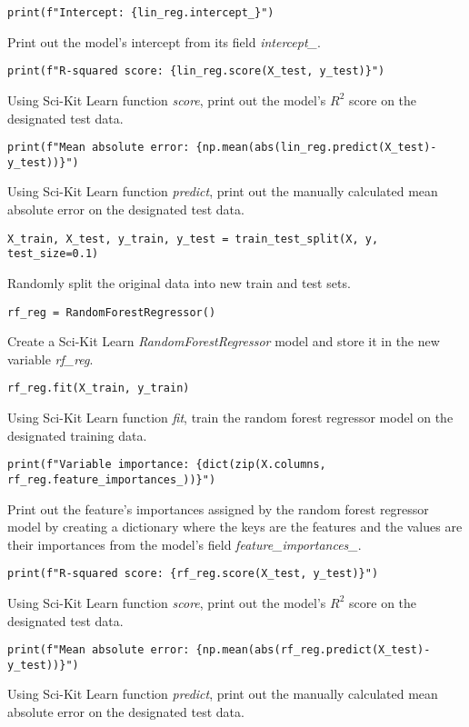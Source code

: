 \documentclass{article}
\begin{document}
\begin{lstlisting}
print(f"Intercept: {lin_reg.intercept_}")
\end{lstlisting}
Print out the model's intercept from its field \textit{intercept_}.
\begin{lstlisting}
print(f"R-squared score: {lin_reg.score(X_test, y_test)}")
\end{lstlisting}
Using Sci-Kit Learn function \textit{score}, print out the model's $R^2$ score on the designated test data.
\begin{lstlisting}
print(f"Mean absolute error: {np.mean(abs(lin_reg.predict(X_test)- y_test))}")
\end{lstlisting}
Using Sci-Kit Learn function \textit{predict}, print out the manually calculated mean absolute error on the designated test data.
\begin{lstlisting}
X_train, X_test, y_train, y_test = train_test_split(X, y, test_size=0.1)
\end{lstlisting}
Randomly split the original data into new train and test sets.
\begin{lstlisting}
rf_reg = RandomForestRegressor()
\end{lstlisting}
Create a Sci-Kit Learn \textit{RandomForestRegressor} model and store it in the new variable \textit{rf_reg}.
\begin{lstlisting}
rf_reg.fit(X_train, y_train)
\end{lstlisting}
Using Sci-Kit Learn function \textit{fit}, train the random forest regressor model on the designated training data.
\begin{lstlisting}
print(f"Variable importance: {dict(zip(X.columns, rf_reg.feature_importances_))}")
\end{lstlisting}
Print out the feature's importances assigned by the random forest regressor model by creating a dictionary where the keys are the features and the values are their importances from the model's field \textit{feature_importances_}.
\begin{lstlisting}
print(f"R-squared score: {rf_reg.score(X_test, y_test)}")
\end{lstlisting}
Using Sci-Kit Learn function \textit{score}, print out the model's $R^2$ score on the designated test data.
\begin{lstlisting}
print(f"Mean absolute error: {np.mean(abs(rf_reg.predict(X_test)- y_test))}")
\end{lstlisting}
Using Sci-Kit Learn function \textit{predict}, print out the manually calculated mean absolute error on the designated test data.
\end{document}
